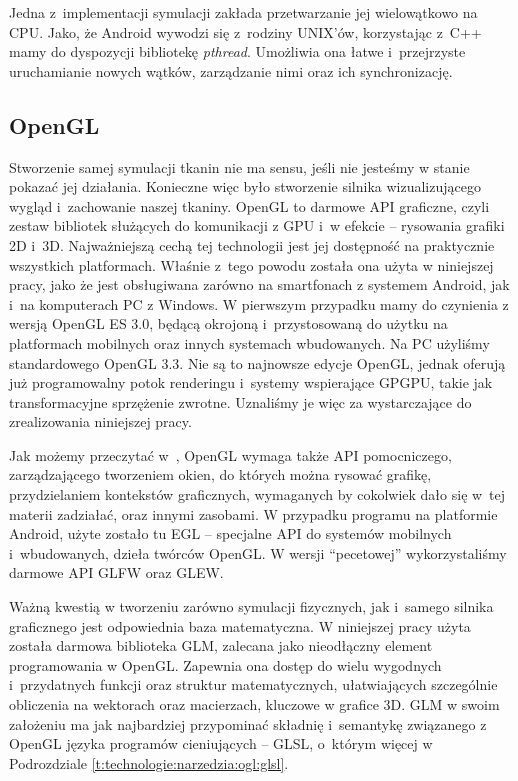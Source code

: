 		Jedna z~implementacji symulacji zakłada przetwarzanie jej wielowątkowo na CPU. Jako, że Android wywodzi się z~rodziny UNIX'ów, korzystając z~C++ mamy do dyspozycji bibliotekę \emph{pthread}. Umożliwia ona łatwe i~przejrzyste uruchamianie nowych wątków, zarządzanie nimi oraz ich synchronizację.
	
		\subsection{OpenGL}
		\label{t:technologie:narzedzia:ogl}
		
		
		Stworzenie samej symulacji tkanin nie ma sensu, jeśli nie jesteśmy w stanie pokazać jej działania. Konieczne więc było stworzenie silnika wizualizującego wygląd i~zachowanie naszej tkaniny. OpenGL to darmowe API graficzne, czyli zestaw bibliotek służących do komunikacji z GPU i~w efekcie -- rysowania grafiki 2D i~3D. Najważniejszą cechą tej technologii jest jej dostępność na praktycznie wszystkich platformach. Właśnie z~tego powodu została ona użyta w niniejszej pracy, jako że jest obsługiwana zarówno na smartfonach z systemem Android, jak i~na komputerach PC z Windows. W pierwszym przypadku mamy do czynienia z wersją OpenGL ES 3.0, będącą okrojoną i~przystosowaną do użytku na platformach mobilnych oraz innych systemach wbudowanych. Na PC użyliśmy standardowego OpenGL 3.3. Nie są to najnowsze edycje OpenGL, jednak oferują już programowalny potok renderingu i~systemy wspierające GPGPU, takie jak transformacyjne sprzężenie zwrotne. Uznaliśmy je więc za wystarczające do zrealizowania niniejszej pracy.
		
		Jak możemy przeczytać w~\cite{oglspec}, OpenGL wymaga także API pomocniczego, zarządzającego tworzeniem okien, do których można rysować grafikę, przydzielaniem kontekstów graficznych, wymaganych by cokolwiek dało się w~tej materii zadziałać, oraz innymi zasobami. W przypadku programu na platformie Android, użyte zostało tu EGL -- specjalne API do systemów mobilnych i~wbudowanych, dzieła twórców OpenGL. W wersji ``pecetowej'' wykorzystaliśmy darmowe API GLFW oraz GLEW.
		
		Ważną kwestią w tworzeniu zarówno symulacji fizycznych, jak i~samego silnika graficznego jest odpowiednia baza matematyczna. W niniejszej pracy użyta została darmowa biblioteka GLM, zalecana jako nieodłączny element programowania w OpenGL. Zapewnia ona dostęp do wielu wygodnych i~przydatnych funkcji oraz struktur matematycznych, ułatwiających szczególnie obliczenia na wektorach oraz macierzach, kluczowe w grafice 3D. GLM w swoim założeniu ma jak najbardziej przypominać składnię i~semantykę związanego z OpenGL języka programów cieniujących -- GLSL, o~którym więcej w Podrozdziale \ref{t:technologie:narzedzia:ogl:glsl}.
		
